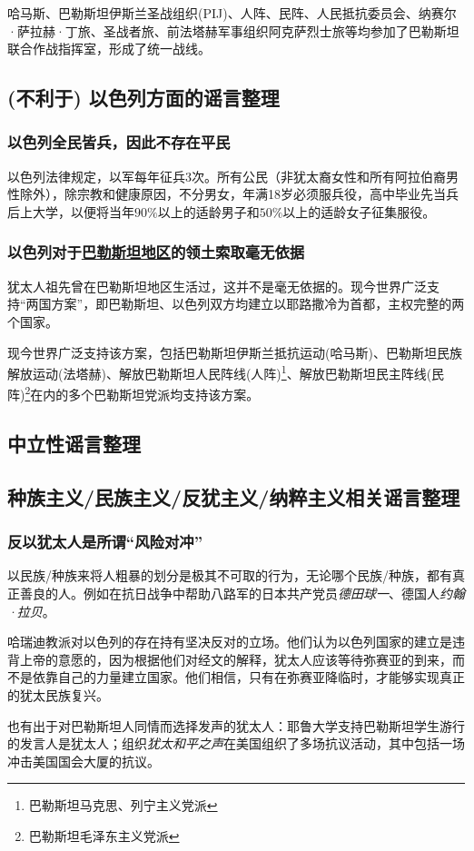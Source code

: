 \documentclass[UTF8]{ctexart}
\begin{document}
                哈马斯、巴勒斯坦伊斯兰圣战组织(PIJ)、人阵、民阵、人民抵抗委员会、纳赛尔·萨拉赫·丁旅、圣战者旅、前法塔赫军事组织阿克萨烈士旅等均参加了巴勒斯坦联合作战指挥室，形成了统一战线。\cite{wiki:Palestinian_Joint_Operations_Room}

        \subsection{(不利于) 以色列方面的谣言整理}
            \subsubsection{以色列全民皆兵，因此不存在平民}
                以色列法律规定，以军每年征兵3次。所有公民（非犹太裔女性和所有阿拉伯裔男性除外），除宗教和健康原因，不分男女，年满18岁必须服兵役，高中毕业先当兵后上大学，以便将当年$90\%$以上的适龄男子和$50\%$以上的适龄女子征集服役。\cite{中国国防报2020全民皆兵的以色列战争动员模式}
            
            \subsubsection{以色列对于\uline{巴勒斯坦地区}的领土索取毫无依据}
                犹太人祖先曾在巴勒斯坦地区生活过，这并不是毫无依据的。现今世界广泛支持“两国方案”，即巴勒斯坦、以色列双方均建立以耶路撒冷为首都，主权完整的两个国家。
                
                现今世界广泛支持该方案，包括巴勒斯坦伊斯兰抵抗运动(哈马斯)、巴勒斯坦民族解放运动(法塔赫)、解放巴勒斯坦人民阵线(人阵)\footnote{巴勒斯坦马克思、列宁主义党派}、解放巴勒斯坦民主阵线(民阵)\footnote{巴勒斯坦毛泽东主义党派}在内的多个巴勒斯坦党派均支持该方案。

        \subsection{中立性谣言整理}
        
        \subsection{种族主义/民族主义/反犹主义/纳粹主义相关谣言整理}
            \subsubsection{反以犹太人是所谓“风险对冲”}
                以民族/种族来将人粗暴的划分是极其不可取的行为，无论哪个民族/种族，都有真正善良的人。例如在抗日战争中帮助八路军的日本共产党员\textit{德田球一}、德国人\textit{约翰·拉贝}。

                哈瑞迪教派对以色列的存在持有坚决反对的立场。他们认为以色列国家的建立是违背上帝的意愿的，因为根据他们对经文的解释，犹太人应该等待弥赛亚的到来，而不是依靠自己的力量建立国家。他们相信，只有在弥赛亚降临时，才能够实现真正的犹太民族复兴。\cite{半岛电视台2023哈瑞迪从边缘走向中心}

                也有出于对巴勒斯坦人同情而选择发声的犹太人：耶鲁大学支持巴勒斯坦学生游行的发言人是犹太人\cite{bilibili:巴勒斯坦游行犹太人发言人2024}；组织\textit{犹太和平之声}在美国组织了多场抗议活动，其中包括一场冲击美国国会大厦的抗议。
    \printbibliography
\end{document}
